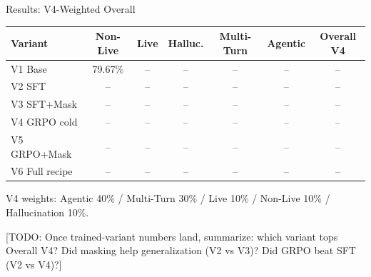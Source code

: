\documentclass[aspectratio=169,11pt]{beamer}
\newcommand{\todo}[1]{{\color{tbd}\textsf{[TODO: #1]}}}
\newcommand{\tbd}{{\color{tbd}--}}
\begin{document}
\begin{frame}{Results: V4-Weighted Overall}
  \begin{table}
    \centering
    \scriptsize
    \begin{tabular}{lcccccc}
      \toprule
      \textbf{Variant} & \textbf{Non-Live} & \textbf{Live} & \textbf{Halluc.} & \textbf{Multi-Turn} & \textbf{Agentic} & \textbf{Overall V4} \\
      \midrule
      V1 Base               & 79.67\% & \tbd & \tbd & \tbd & \tbd & \tbd \\
      V2 SFT                & \tbd & \tbd & \tbd & \tbd & \tbd & \tbd \\
      V3 SFT+Mask           & \tbd & \tbd & \tbd & \tbd & \tbd & \tbd \\
      V4 GRPO cold          & \tbd & \tbd & \tbd & \tbd & \tbd & \tbd \\
      V5 GRPO+Mask          & \tbd & \tbd & \tbd & \tbd & \tbd & \tbd \\
      V6 Full recipe        & \tbd & \tbd & \tbd & \tbd & \tbd & \tbd \\
      \bottomrule
    \end{tabular}
  \end{table}
  \vspace{2pt}
  {\small\color{dimgray} V4 weights: Agentic 40\% / Multi-Turn 30\% / Live 10\% / Non-Live 10\% / Hallucination 10\%.}
  \vspace{6pt}

  \todo{Once trained-variant numbers land, summarize: which variant tops Overall V4? Did masking help generalization (V2 vs V3)? Did GRPO beat SFT (V2 vs V4)?}
\end{frame}
\end{document}
